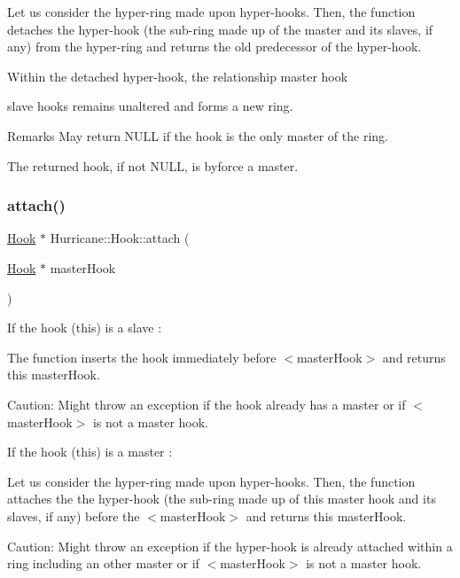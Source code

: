 Let us consider the hyper-\/ring made upon hyper-\/hooks. Then, the function detaches the hyper-\/hook (the sub-\/ring made up of the master and its slaves, if any) from the hyper-\/ring and returns the old predecessor of the hyper-\/hook.

Within the detached hyper-\/hook, the relationship master hook
\begin{DoxyItemize}
\item slave hooks remains unaltered and forms a new ring.
\end{DoxyItemize}

\begin{DoxyRemark}{Remarks}
May return N\+U\+LL if the hook is the only master of the ring.
\end{DoxyRemark}
The returned hook, if not N\+U\+LL, is byforce a master. \mbox{\label{classHurricane_1_1Hook_aacc4dacd0d128b35fd15546bc6dde3c3}} 
\subsubsection{\texorpdfstring{attach()}{attach()}}
{\footnotesize\ttfamily \mbox{\hyperlink{classHurricane_1_1Hook}{Hook}} $\ast$ Hurricane\+::\+Hook\+::attach (\begin{DoxyParamCaption}\item[{\mbox{\hyperlink{classHurricane_1_1Hook}{Hook}} $\ast$}]{master\+Hook }\end{DoxyParamCaption})}

If the hook (this) is a slave \+:

The function inserts the hook immediately before {\ttfamily $<$master\+Hook$>$} and returns this master\+Hook.

\begin{DoxyParagraph}{Caution\+: Might throw an exception if the hook already has a master or }
if {\ttfamily $<$master\+Hook$>$} is not a master hook.
\end{DoxyParagraph}
If the hook (this) is a master \+:

Let us consider the hyper-\/ring made upon hyper-\/hooks. Then, the function attaches the the hyper-\/hook (the sub-\/ring made up of this master hook and its slaves, if any) before the {\ttfamily $<$master\+Hook$>$} and returns this master\+Hook.

\begin{DoxyParagraph}{Caution\+: Might throw an exception if the hyper-\/hook is already }
attached within a ring including an other master or if {\ttfamily $<$master\+Hook$>$} is not a master hook. 
\end{DoxyParagraph}
\mbox{\label{classHurricane_1_1Hook_a7b98f0796a9080495472d574a23bcca0}} 
